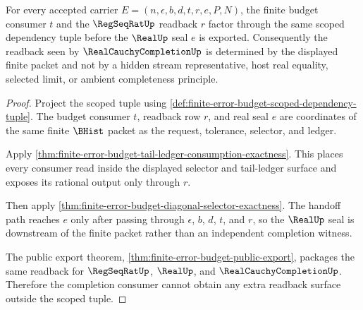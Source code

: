 \begin{theorem}
\label{thm:finite-error-budget-regseqrat-readback-scope}
For every accepted carrier $E=(n,\epsilon,b,d,t,r,e,P,N)$, the finite budget
consumer $t$ and the $\RegSeqRatUp$ readback $r$ factor through the same scoped
dependency tuple before the $\RealUp$ seal $e$ is exported. Consequently the
readback seen by $\RealCauchyCompletionUp$ is determined by the displayed
finite packet and not by a hidden stream representative, host real equality,
selected limit, or ambient completeness principle.
\end{theorem}
\begin{proof}
Project the scoped tuple using
\autoref{def:finite-error-budget-scoped-dependency-tuple}. The budget consumer
$t$, readback row $r$, and real seal $e$ are coordinates of the same finite
$\BHist$ packet as the request, tolerance, selector, and ledger.

Apply \autoref{thm:finite-error-budget-tail-ledger-consumption-exactness}.
This places every consumer read inside the displayed selector and tail-ledger
surface and exposes its rational output only through $r$.

Then apply \autoref{thm:finite-error-budget-diagonal-selector-exactness}. The
handoff path reaches $e$ only after passing through $\epsilon$, $b$, $d$, $t$,
and $r$, so the $\RealUp$ seal is downstream of the finite packet rather than
an independent completion witness.

The public export theorem,
\autoref{thm:finite-error-budget-public-export}, packages the same readback
for $\RegSeqRatUp$, $\RealUp$, and $\RealCauchyCompletionUp$. Therefore the
completion consumer cannot obtain any extra readback surface outside the
scoped tuple.
\end{proof}

